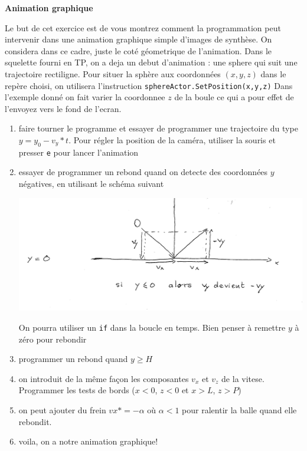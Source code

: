 \documentclass[11pt]{letter}
\begin{document}
\textbf{Animation graphique}

 Le but de cet exercice est de vous montrez comment la programmation peut intervenir dans une animation graphique simple d'images de synthèse.
 On considera dans ce cadre, juste le coté géometrique de l'animation. Dans le squelette fourni en TP, on a deja un debut d'animation  : 
 une sphere qui suit une trajectoire rectiligne. 
 Pour situer la sphère aux coordonnées $(x,y,z)$ dans le repère choisi, on utilisera l'instruction \texttt{sphereActor.SetPosition(x,y,z)}
 Dans l'exemple donné on fait varier la coordonnee $z$ de la boule ce qui a pour effet de l'envoyez vers le fond de l'ecran.

 
 \begin{enumerate} 
 
    \item faire tourner le programme et essayer de programmer une trajectoire du type $y = y_0 - v_y * t$. Pour régler la position de la caméra, utiliser
    la souris et presser \texttt{e} pour lancer l'animation
    \item essayer de programmer un rebond quand on detecte des coordonnées $y$ négatives, en utilisant le schéma suivant 
   \begin{center}
     \includegraphics[width=0.8\linewidth]{rebond.pdf}
   \end{center}
   On pourra utiliser un \texttt{if} dans la boucle en temps. Bien penser à remettre $y$ à zéro pour rebondir
   \item programmer un rebond quand $y \geqslant H$
   \item on introduit de la même façon les composantes $v_x$ et $v_z$ de la vitese. Programmer les tests de bords ($x <0$, $z < 0$ et $x > L$, $z > P$)
   \item on peut ajouter du frein $vx *= -\alpha$ où $\alpha < 1$ pour ralentir la balle quand elle rebondit.
   \item voila, on a notre animation graphique!
    
  \end{enumerate}
\end{document}
